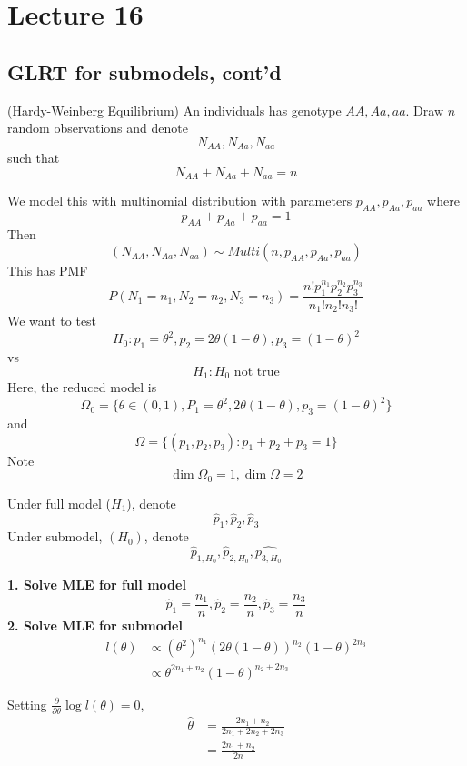\section{Lecture 16}

\subsection{GLRT for submodels, cont'd}

\begin{example} (Hardy-Weinberg Equilibrium)
    An individuals has genotype $AA, Aa, aa$. Draw $n$ random observations and denote 
    \[
        N_{AA}, N_{Aa}, N_{aa}
    \]
    such that 
    \[
        N_{AA}+ N_{Aa}+ N_{aa} = n
    \]

    We model this with multinomial distribution with parameters $p_{AA}, p_{Aa}, p_{aa}$ where 
    \[
        p_{AA}+ p_{Aa}+ p_{aa} = 1
    \]
    Then 
    \[
        (N_{AA}, N_{Aa}, N_{aa}) \sim Multi(n, p_{AA}, p_{Aa}, p_{aa})
    \]
    This has PMF 
    \[
    P(N_1 = n_1, N_2 = n_2, N_3 = n_3)= \frac{n! p_1^{n_1} p_2^{n_2} p_3^{n_3}}{n_1 ! n_2 ! n_3 !}
    \]
    We want to test 
    \[
        H_0: p_1 = \theta^2, p_2 = 2 \theta (1 - \theta), p_3 = ( 1- \theta)^2
    \]
    vs 
    \[
        H_1: H_0 \text{ not true}
    \]
    Here, the reduced model is 
    \[
    \Omega_0 = \{ \theta \in (0, 1), P_1 = \theta^2, 2 \theta (1 - \theta), p_3 = (1 - \theta)^2\} 
    \]
    and 
    \[
        \Omega = \{ 
            (p_1, p_2, p_3): p_1 + p_2 + p_3 = 1 \} 
    \]
    Note 
    \[
        \dim \Omega_0 = 1, \dim \Omega = 2
    \]

    Under full model ($H_1$), denote 
    \[
        \hat{p}_1, \hat{p}_2, \hat{p}_3
    \]
    Under submodel, $(H_0)$, denote
    \[
        \hat{p}_{1, H_0}, \hat{p}_{2, H_0}, \hat{p_{3, H_0}}
    \]

    \textbf{1. Solve MLE for full model}
    \[
        \hat{p}_1 = \frac{n_1}{n}, \hat{p}_2 = \frac{n_2}{n}, \hat{p}_3 = \frac{n_3}{n}
    \]
    \textbf{2. Solve MLE for submodel}
    \begin{align*}
        l( \theta) & \propto \left( \theta^2 \right)^{n_1} \left( 2 \theta( 1- \theta) \right)^{n_2} (1 - \theta)^{2 n_3} \\
        & \propto \theta^{2 n_1 + n_2 } ( 1- \theta)^{n_2 + 2n_3}
    \end{align*}

    Setting $ \frac{\partial }{\partial \theta} \log l( \theta) = 0$, 
    \begin{align*}
        \hat{ \theta} &= \frac{2n_1 + n_2}{2n_1 + 2n_2 + 2n_3} \\
        &= \frac{2n_1 + n_2}{2n}
    \end{align*}


\end{example}
